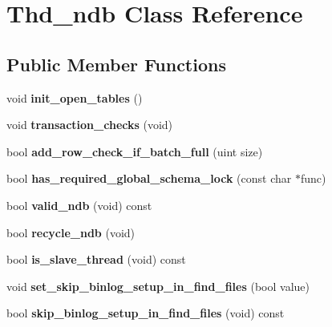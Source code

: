 \hypertarget{classThd__ndb}{}\section{Thd\+\_\+ndb Class Reference}
\label{classThd__ndb}
\subsection*{Public Member Functions}
\begin{DoxyCompactItemize}
\item 
\mbox{\label{classThd__ndb_acf1ce4607b6f9d69f93a3fab75da4313}} 
void {\bfseries init\+\_\+open\+\_\+tables} ()
\item 
\mbox{\label{classThd__ndb_a24aa990c3fa2ebda50e36ca3c064fc4c}} 
void {\bfseries transaction\+\_\+checks} (void)
\item 
\mbox{\label{classThd__ndb_acf69f05f416606868d5d0caaed0eedc7}} 
bool {\bfseries add\+\_\+row\+\_\+check\+\_\+if\+\_\+batch\+\_\+full} (uint size)
\item 
\mbox{\label{classThd__ndb_a2a41a722c813200585411fed3cabca6c}} 
bool {\bfseries has\+\_\+required\+\_\+global\+\_\+schema\+\_\+lock} (const char $\ast$func)
\item 
\mbox{\label{classThd__ndb_aac277ef455a816d1ca655d72bfe59dec}} 
bool {\bfseries valid\+\_\+ndb} (void) const
\item 
\mbox{\label{classThd__ndb_a9f22050ac3e16cfd7a95a2475538b3c7}} 
bool {\bfseries recycle\+\_\+ndb} (void)
\item 
\mbox{\label{classThd__ndb_a45adada9cd0110047c31d1a91b1f8561}} 
bool {\bfseries is\+\_\+slave\+\_\+thread} (void) const
\item 
\mbox{\label{classThd__ndb_a5dcd877fa9b14a52194cedc2de0cbe94}} 
void {\bfseries set\+\_\+skip\+\_\+binlog\+\_\+setup\+\_\+in\+\_\+find\+\_\+files} (bool value)
\item 
\mbox{\label{classThd__ndb_ab0582a5d0c0f315eeab6d4834aa1e92b}} 
bool {\bfseries skip\+\_\+binlog\+\_\+setup\+\_\+in\+\_\+find\+\_\+files} (void) const
\end{DoxyCompactItemize}

